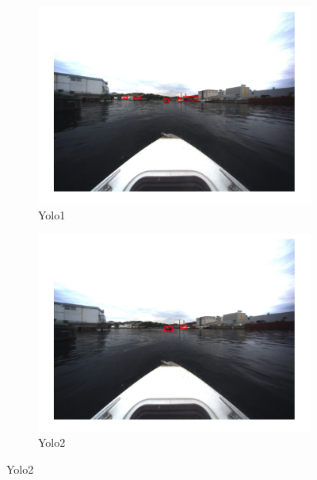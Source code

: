 \begin{figure}[h!]
\centering
\begin{subfigure}[b]{0.6\textwidth}
   \includegraphics[width=1\linewidth]{results/kamsvag/yolo1_figure_1451.jpg}
   \caption{Yolo1}
\end{subfigure}

\begin{subfigure}[b]{0.6\textwidth}
   \includegraphics[width=1\linewidth]{results/kamsvag/yolo2_figure_1479.jpg}
   \caption{Yolo2}
\end{subfigure}


\end{figure}
